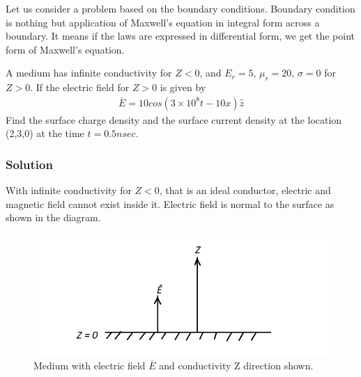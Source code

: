 Let us consider a problem based on the boundary conditions. Boundary condition is nothing but application of Maxwell's equation in integral form across a boundary. It means if the laws are expressed in differential form, we get the point form of Maxwell's equation.
\begin{exmp}
A medium has infinite conductivity for $Z<0$, and $E_r=5$, $\mu_r = 20$, $\sigma = 0$ for $Z>0$. If the electric field for $Z>0$ is given by 
\begin{align*}
\overline{E} = 10cos(3\times 10^8t - 10x)\hat{z}
\end{align*}
Find the surface charge density and the surface current density at the location (2,3,0) at the time $t = 0.5nsec$.\\
\subsubsection*{Solution}
With infinite conductivity for $Z<0$, that is an ideal conductor, electric and magnetic field cannot exist inside it. Electric field is normal to the surface as shown in the diagram.
\begin{figure}[h]
\centering
\includegraphics[width=1\linewidth]{./graphics/diemedium7}
\caption{Medium with electric field $\overline{E}$ and conductivity Z direction shown.}
\end{figure}


\end{exmp}

